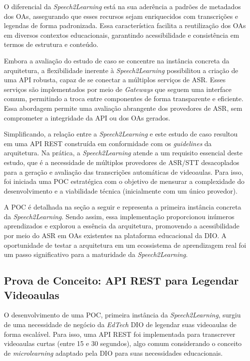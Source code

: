 O diferencial da \textit{Speech2Learning} está na sua aderência a padrões de metadados dos OAs, assegurando que esses recursos sejam enriquecidos com transcrições e legendas de forma padronizada. Essa característica facilita a reutilização dos OAs em diversos contextos educacionais, garantindo acessibilidade e consistência em termos de estrutura e conteúdo.

Embora a avaliação do estudo de caso se concentre na instância concreta da arquitetura, a flexibilidade inerente à \textit{Speech2Learning} possibilitou a criação de uma API robusta, capaz de se conectar a múltiplos serviços de ASR. Esses serviços são implementados por meio de \textit{Gateways} que seguem uma interface comum, permitindo a troca entre componentes de forma transparente e eficiente. Essa abordagem permite uma avaliação abrangente dos provedores de ASR, sem comprometer a integridade da API ou dos OAs gerados.

Simplificando, a relação entre a \textit{Speech2Learning} e este estudo de caso resultou em uma API REST construída em conformidade com os \textit{guidelines} da arquitetura. Na prática, a \textit{Speech2Learning} atende a um requisito essencial deste estudo, que é a necessidade de múltiplos provedores de ASR/STT desacoplados para a geração e avaliação das transcrições automáticas de videoaulas. Para isso, foi iniciada uma POC estratégica com o objetivo de mensurar a complexidade do desenvolvimento e a viabilidade técnica (inicialmente com um único provedor).

A POC é detalhada na seção a seguir e representa a primeira instância concreta da \textit{Speech2Learning}. Sendo assim, essa implementação proporcionou inúmeros aprendizados e explorou a essência da arquitetura, promovendo a acessibilidade por meio do ASR em OAs existentes na plataforma educacional da DIO. A oportunidade de testar a arquitetura em um ecossistema de aprendizagem real foi um passo significativo para a maturidade da \textit{Speech2Learning}.

\subsection{Prova de Conceito: API REST para Legendar Videoaulas}

O desenvolvimento de uma POC, primeira instância da \textit{Speech2Learning}, surgiu de uma necessidade de negócio da \textit{EdTech} DIO de legendar suas videoaulas de forma escalável. Para isso, uma API REST foi implementada para transcrever videoaulas curtas (entre 15 e 30 segundos), algo comum considerando o conceito de \textit{microlearning} adaptado pela DIO para suas necessidades educacionais. 

